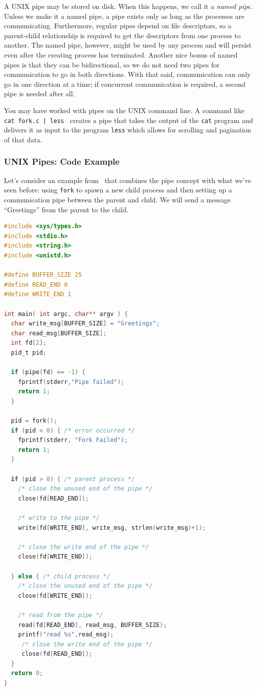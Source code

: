 A UNIX pipe may be stored on disk. When this happens, we call it a \textit{named pipe}. Unless we make it a named pipe, a pipe exists only as long as the processes are communicating. Furthermore, regular pipes depend on file descriptors, so a parent-child relationship is required to get the descriptors from one process to another. The named pipe, however, might be used by any process and will persist even after the creating process has terminated. Another nice bonus of named pipes is that they can be bidirectional, so we do not need two pipes for communication to go in both directions. With that said, communication can only go in one direction at a time; if concurrent communication is required, a second pipe is needed after all.

You may have worked with pipes on the UNIX command line. A command like \texttt{ cat fork.c | less } creates a pipe that takes the output of the \texttt{cat} program and delivers it as input to the program \texttt{less} which allows for scrolling and pagination of that data.

\subsubsection*{UNIX Pipes: Code Example}

Let's consider an example from~\cite{osc} that combines the pipe concept with what we've seen before: using \texttt{fork} to spawn a new child process and then setting up a communication pipe between the parent and child. We will send a message ``Greetings'' from the parent to the child.

\begin{lstlisting}[language=C]
#include <sys/types.h> 
#include <stdio.h> 
#include <string.h> 
#include <unistd.h>

#define BUFFER_SIZE 25
#define READ_END 0 
#define WRITE_END 1

int main( int argc, char** argv ) {
  char write_msg[BUFFER_SIZE] = "Greetings"; 
  char read_msg[BUFFER_SIZE];
  int fd[2];
  pid_t pid;

  if (pipe(fd) == -1) {
    fprintf(stderr,"Pipe failed");
    return 1;
  }
  
  pid = fork();
  if (pid < 0) { /* error occurred */ 
    fprintf(stderr, "Fork Failed"); 
    return 1;
  }

  if (pid > 0) { /* parent process */
    /* close the unused end of the pipe */ 
    close(fd[READ_END]);
    
    /* write to the pipe */
    write(fd[WRITE_END], write_msg, strlen(write_msg)+1);
    
    /* close the write end of the pipe */
    close(fd[WRITE_END]);
    
  } else { /* child process */
    /* close the unused end of the pipe */ 
    close(fd[WRITE_END]);
    
    /* read from the pipe */
    read(fd[READ_END], read_msg, BUFFER_SIZE); 
    printf("read %s",read_msg);
     /* close the write end of the pipe */
     close(fd[READ_END]);
  }
  return 0;
}
\end{lstlisting}

